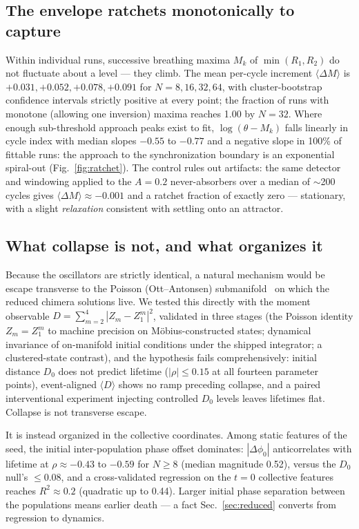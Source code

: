 \documentclass[pdflatex,sn-mathphys,Numbered]{sn-jnl}
\begin{document}
\subsection{The envelope ratchets monotonically to capture}

Within individual runs, successive breathing maxima $M_k$ of $\min(R_1, R_2)$ do not
fluctuate about a level --- they climb. The mean per-cycle increment
$\langle \Delta M \rangle$ is $+0.031, +0.052, +0.078, +0.091$ for
$N = 8, 16, 32, 64$, with cluster-bootstrap confidence intervals strictly positive
at every point; the fraction of runs with monotone (allowing one inversion) maxima
reaches 1.00 by $N = 32$. Where enough sub-threshold approach peaks exist to fit,
$\log(\theta - M_k)$ falls linearly in cycle index with median slopes $-0.55$ to
$-0.77$ and a negative slope in 100\% of fittable runs: the approach to the
synchronization boundary is an exponential spiral-out (Fig.~\ref{fig:ratchet}). The
control rules out artifacts: the same detector and windowing applied to the
$A = 0.2$ never-absorbers over a median of $\sim$200 cycles gives
$\langle \Delta M \rangle \approx -0.001$ and a ratchet fraction of exactly zero ---
stationary, with a slight \emph{relaxation} consistent with settling onto an
attractor.

\subsection{What collapse is not, and what organizes it}

Because the oscillators are strictly identical, a natural mechanism would be escape
transverse to the Poisson (Ott--Antonsen) submanifold~\cite{ott2008,ott2009} on
which the reduced chimera solutions live. We tested this directly with the moment observable
$D = \sum_{m=2}^{4} |Z_m - Z_1^m|^2$, validated in three stages (the Poisson
identity $Z_m = Z_1^m$ to machine precision on M\"obius-constructed states;
dynamical invariance of on-manifold initial conditions under the shipped integrator;
a clustered-state contrast), and the hypothesis fails comprehensively: initial
distance $D_0$ does not predict lifetime ($|\rho| \le 0.15$ at all fourteen
parameter points), event-aligned $\langle D \rangle$ shows no ramp preceding
collapse, and a paired interventional experiment injecting controlled $D_0$ levels
leaves lifetimes flat. Collapse is not transverse escape.

It is instead organized in the collective coordinates. Among static features of the
seed, the initial inter-population phase offset dominates: $|\Delta\phi_0|$
anticorrelates with lifetime at $\rho \approx -0.43$ to $-0.59$ for $N \ge 8$
(median magnitude 0.52), versus the $D_0$ null's $\le 0.08$, and a cross-validated
regression on the $t = 0$ collective features reaches $R^2 \approx 0.2$
(quadratic up to 0.44). Larger initial phase separation between the populations
means earlier death --- a fact Sec.~\ref{sec:reduced} converts from regression to
dynamics.
\end{document}
